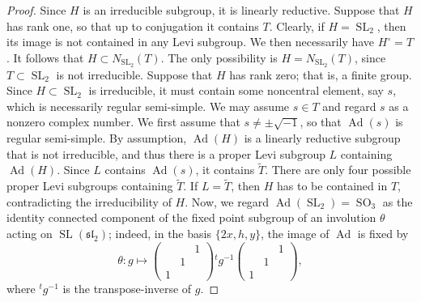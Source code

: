 \documentclass[11pt,oneside,dvipsnames]{amsart}
\theoremstyle{plain}
\theoremstyle{definition}
\theoremstyle{named}
\DeclareMathOperator{\Ad}{Ad}
\DeclareMathOperator{\SL}{SL}
\DeclareMathOperator{\SO}{SO}
\begin{document}
\begin{proof}
Since $H$ is an irreducible subgroup, it is linearly reductive. Suppose that $H$ has rank one, so that up to conjugation it contains $T$. Clearly, if $H=\SL_2$, then its image is not contained in any Levi subgroup. We then necessarily have $H^{\circ}=T$. It follows that $H\subset N_{\SL_2}(T)$. The only possibility is $H=N_{\SL_2}(T)$, since $T\subset\SL_2$ is not irreducible. Suppose that $H$ has rank zero; that is, a finite group. Since $H\subset\SL_2$ is irreducible, it must contain some noncentral element, say $s$, which is necessarily regular semi-simple. We may assume $s\in T$ and regard $s$ as a nonzero complex number. We first assume that $s\ne\pm\sqrt{-1}$, so that $\Ad(s)$ is regular semi-simple. By assumption, $\Ad(H)$ is a linearly reductive subgroup that is not irreducible, and thus there is a proper Levi subgroup $L$ containing $\Ad(H)$. Since $L$ contains $\Ad(s)$, it contains $\tilde{T}$. There are only four possible proper Levi subgroups containing $\tilde{T}$. If $L=\tilde{T}$, then $H$ has to be contained in $T$, contradicting the irreducibility of $H$. Now, we regard $\Ad(\SL_2)=\SO_3$ as the identity connected component of the fixed point subgroup of an involution $\theta$ acting on $\SL(\mathfrak{sl}_2)$; indeed, in the basis $\{2x,h,y\}$, the image of $\Ad$ is fixed by 
$$
\theta:g\longmapsto
\left(
\begin{array}{ccc}
& & 1\\
&1& \\
\!\!1& &
\end{array}
\right)
{}^{t}g^{-1}
\left(
\begin{array}{ccc}
& & 1\\
&1& \\
\!\!1& &
\end{array}
\right),
$$ 
where ${}^{t}g^{-1}$ is the transpose-inverse of $g$.

\end{proof}
\end{document}
